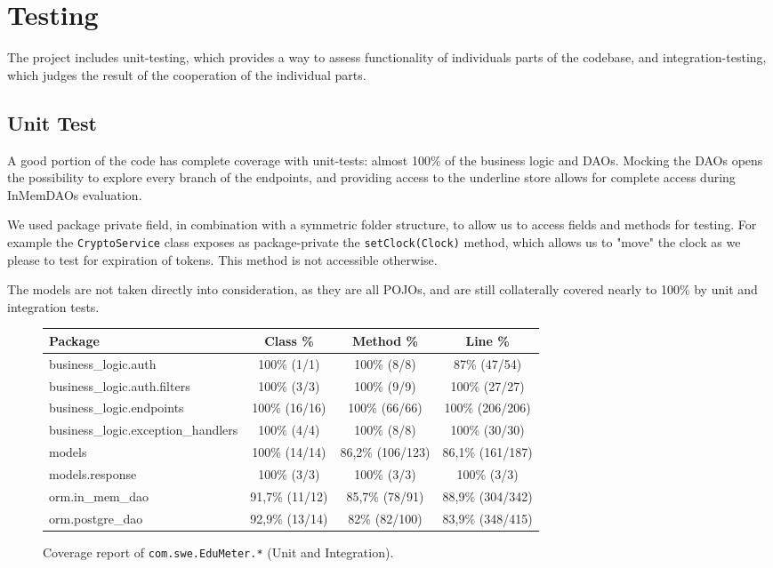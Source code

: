 \section{Testing}

The project includes unit-testing, which provides a way to assess functionality of individuals parts of the codebase, and integration-testing, which judges the result of the cooperation of the individual parts.

\subsection{Unit Test}

A good portion of the code has complete coverage with unit-tests: almost 100\% of the business logic and DAOs. Mocking the DAOs opens the possibility to explore every branch of the endpoints, and providing access to the underline store allows for complete access during InMemDAOs evaluation.

We used package private field, in combination with a symmetric folder structure, to allow us to access fields and methods for testing. For example the \verb|CryptoService| class exposes as package-private the \verb|setClock(Clock)| method, which allows us to "move" the clock as we please to test for expiration of tokens. This method is not accessible otherwise.

The models are not taken directly into consideration, as they are all POJOs, and are still collaterally covered nearly to 100\% by unit and integration tests.

\begin{figure}[H]
	\centering

	\setlength{\arrayrulewidth}{0.5mm}

	\renewcommand{\arraystretch}{1.5}
	\begin{tabular}{l c c c}
		\textbf{Package} & \textbf{Class \%} & \textbf{Method \%} & \textbf{Line \%} \\
		\hline
		business\_logic.auth & 100\% (1/1) & 100\% (8/8) & 87\% (47/54) \\
		business\_logic.auth.filters & 100\% (3/3) & 100\% (9/9) & 100\% (27/27) \\
		business\_logic.endpoints & 100\% (16/16) & 100\% (66/66) & 100\% (206/206) \\
		business\_logic.exception\_handlers & 100\% (4/4) & 100\% (8/8) & 100\% (30/30) \\
		models & 100\% (14/14) & 86,2\% (106/123) & 86,1\% (161/187) \\
		models.response & 100\% (3/3) & 100\% (3/3) & 100\% (3/3) \\
		orm.in\_mem\_dao & 91,7\% (11/12) & 85,7\% (78/91) & 88,9\% (304/342) \\
		orm.postgre\_dao & 92,9\% (13/14) & 82\% (82/100) & 83,9\% (348/415) \\
	\end{tabular}

	\caption{Coverage report of \texttt{com.swe.EduMeter.*} (Unit and Integration).}
\end{figure}

